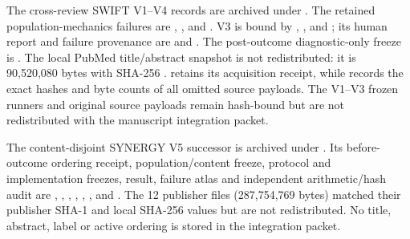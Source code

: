 The cross-review SWIFT V1--V4 records are archived under
.
The retained population-mechanics failures are ,
,  and
.  V3 is bound by
, ,
 and ; its human report and
failure provenance are  and
.  The post-outcome diagnostic-only freeze is
.  The local PubMed
title/abstract snapshot is not redistributed: it is 90,520,080 bytes with
SHA-256
.
 retains its acquisition receipt, while
 records the exact hashes and byte counts of
all omitted source payloads.  The V1--V3 frozen runners and original source
payloads remain hash-bound but are not redistributed with the manuscript
integration packet.

The content-disjoint SYNERGY V5 successor is archived under
.  Its before-outcome
ordering receipt, population/content freeze, protocol and implementation
freezes, result, failure atlas and independent arithmetic/hash audit are
,
, ,
, ,
, and .  The 12
publisher files (287,754,769 bytes) matched their publisher SHA-1 and local
SHA-256 values but are not redistributed.  No title, abstract, label or active
ordering is stored in the integration packet.

